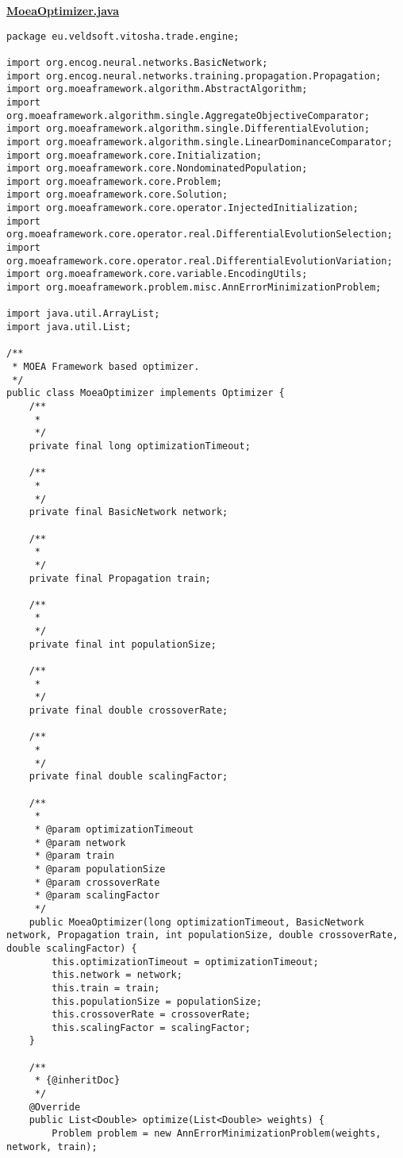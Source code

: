 \textbf{\underline{MoeaOptimizer.java}}
\begin{verbatim}
package eu.veldsoft.vitosha.trade.engine;

import org.encog.neural.networks.BasicNetwork;
import org.encog.neural.networks.training.propagation.Propagation;
import org.moeaframework.algorithm.AbstractAlgorithm;
import org.moeaframework.algorithm.single.AggregateObjectiveComparator;
import org.moeaframework.algorithm.single.DifferentialEvolution;
import org.moeaframework.algorithm.single.LinearDominanceComparator;
import org.moeaframework.core.Initialization;
import org.moeaframework.core.NondominatedPopulation;
import org.moeaframework.core.Problem;
import org.moeaframework.core.Solution;
import org.moeaframework.core.operator.InjectedInitialization;
import org.moeaframework.core.operator.real.DifferentialEvolutionSelection;
import org.moeaframework.core.operator.real.DifferentialEvolutionVariation;
import org.moeaframework.core.variable.EncodingUtils;
import org.moeaframework.problem.misc.AnnErrorMinimizationProblem;

import java.util.ArrayList;
import java.util.List;

/**
 * MOEA Framework based optimizer.
 */
public class MoeaOptimizer implements Optimizer {
    /**
     *
     */
    private final long optimizationTimeout;

    /**
     *
     */
    private final BasicNetwork network;

    /**
     *
     */
    private final Propagation train;

    /**
     *
     */
    private final int populationSize;

    /**
     *
     */
    private final double crossoverRate;

    /**
     *
     */
    private final double scalingFactor;

    /**
     *
     * @param optimizationTimeout
     * @param network
     * @param train
     * @param populationSize
     * @param crossoverRate
     * @param scalingFactor
     */
    public MoeaOptimizer(long optimizationTimeout, BasicNetwork network, Propagation train, int populationSize, double crossoverRate, double scalingFactor) {
        this.optimizationTimeout = optimizationTimeout;
        this.network = network;
        this.train = train;
        this.populationSize = populationSize;
        this.crossoverRate = crossoverRate;
        this.scalingFactor = scalingFactor;
    }

    /**
     * {@inheritDoc}
     */
    @Override
    public List<Double> optimize(List<Double> weights) {
        Problem problem = new AnnErrorMinimizationProblem(weights, network, train);


\end{verbatim}
